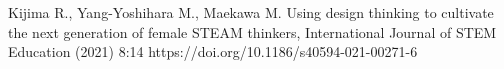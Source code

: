 \documentclass[
12pt,		%
openright,	%
twoside,  %
a4paper,			%
chapter=TITLE,		%
english,			%
french,				%
spanish,			%
brazil				%
]{USPSC-classe/USPSC}
\begin{document}
\begin{flushleft}
\begin{flushleft}
\begin{flushleft}
\begin{flushleft}
\begin{flushleft}
\begin{flushleft}
\begin{flushleft}
\begin{flushleft}
\begin{flushleft}
\begin{flushleft}
[Kijima et al., 2021] Kijima R., Yang-Yoshihara M., Maekawa M. Using design thinking to cultivate the next generation of female STEAM thinkers, International Journal of STEM Education (2021) 8:14 https://doi.org/10.1186/s40594-021-00271-6
\end{flushleft}


\end{flushleft}


\end{flushleft}


\end{flushleft}


\end{flushleft}


\end{flushleft}


\end{flushleft}


\end{flushleft}


\end{flushleft}


\end{flushleft}
\end{document}
